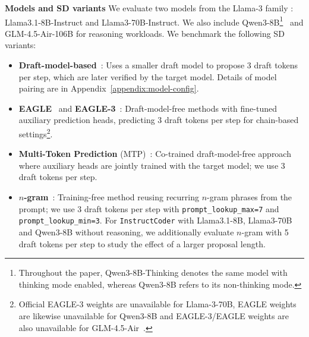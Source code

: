 \documentclass{article}
\newcommand{\jerry}[1]{\textcolor{cyan}{Jerry: #1}}
\begin{document}
\textbf{Models and SD variants}
We evaluate two models from the Llama-3 family \cite{dubey2024llama}:
Llama3.1-8B-Instruct and Llama3-70B-Instruct.
We also include Qwen3-8B\footnote{Throughout the paper, Qwen3-8B-Thinking denotes the same model with thinking mode enabled, whereas Qwen3-8B refers to its non-thinking mode.}~\cite{yang2025qwen3technicalreport} and GLM-4.5-Air-106B \cite{5team2025glm45agenticreasoningcoding} for reasoning workloads. We benchmark the following SD variants:
\begin{itemize} [leftmargin=1.5em, itemsep=0pt]
    \item \textbf{Draft-model-based}~\cite{leviathan2023fast, chen2023accelerating}: Uses a smaller draft model to propose 3 draft tokens per step, which are later verified by the target model. Details of model pairing are in Appendix~\autoref{appendix:model-config}.
  \item \textbf{EAGLE}~\cite{li2024eagle} and \textbf{EAGLE-3}~\cite{li2025eagle3}: Draft-model-free methods with fine-tuned auxiliary prediction heads, predicting 3 draft tokens per step for chain-based settings\footnote{Official EAGLE-3 weights are unavailable for Llama-3-70B, EAGLE weights are likewise unavailable for Qwen3-8B and EAGLE-3/EAGLE weights are also unavailable for GLM-4.5-Air~\cite{li2024eagle}.}.
  \item \textbf{Multi-Token Prediction} (MTP)~\cite{deepseekai2025deepseekv3technicalreport}: Co-trained draft-model-free approach where auxiliary heads are jointly trained with the target model; we use 3 draft tokens per step.
  \item \textbf{$n$-gram}~\cite{saxena2023prompt, somasundaram2024pld+}: Training-free method reusing recurring $n$-gram phrases from the prompt; we use 3 draft tokens per step with {\tt prompt\_lookup\_max=7} and {\tt prompt\_lookup\_min=3}. For \texttt{InstructCoder} with Llama3.1-8B, Llama3-70B and Qwen3-8B without reasoning, we additionally evaluate $n$-gram with 5 draft tokens per step to study the effect of a larger proposal length.
  
\end{itemize}
\end{document}
